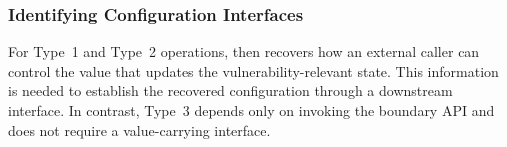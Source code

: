 





\subsubsection{Identifying Configuration Interfaces}\label{subsubsec:downinter}
For Type~1 and Type~2 operations, \sys then recovers how an external caller can control the value that updates the vulnerability-relevant state. This information is needed to establish the recovered configuration through a downstream interface. In contrast, Type~3 depends only on invoking the boundary API and does not require a value-carrying interface.



